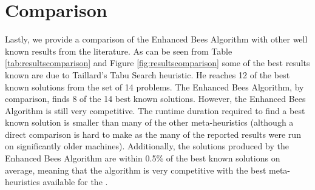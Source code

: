 \section{Comparison}
\label{sec:comparison}

Lastly, we provide a comparison of the Enhanced Bees Algorithm with other well known results from the literature. As can be seen from Table \ref{tab:resultscomparison} and Figure \ref{fig:resultscomparison} some of the best results known are due to Taillard's Tabu Search heuristic. He reaches 12 of the best known solutions from the set of 14 problems. The Enhanced Bees Algorithm, by comparison, finds 8 of the 14 best known solutions. However, the Enhanced Bees Algorithm is still very competitive. The runtime duration required to find a best known solution is smaller than many of the other meta-heuristics (although a direct comparison is hard to make as the many of the reported results were run on significantly older machines). Additionally, the solutions produced by the Enhanced Bees Algorithm are within 0.5\% of the best known solutions on average, meaning that the algorithm is very competitive with the best meta-heuristics available for the \VRP.

